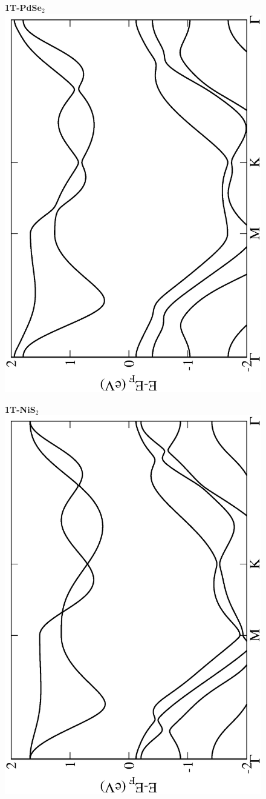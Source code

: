 \begin{figure}[htbp]
\centering
{\bfseries \sffamily 1T-PdSe$_{2}$}\\
\includegraphics[width=0.45\linewidth, angle=-90, trim={2.9cm, 0cm, 2cm, 0cm}, clip]{img/SI_figs/BS/1T-PdSe2.eps}
\end{figure}

\begin{figure}[htbp]
\centering
{\bfseries \sffamily 1T-NiS$_{2}$}\\
\includegraphics[width=0.45\linewidth, angle=-90, trim={2.9cm, 0cm, 2cm, 0cm}, clip]{img/SI_figs/BS/1T-NiS2.eps}
\end{figure}

